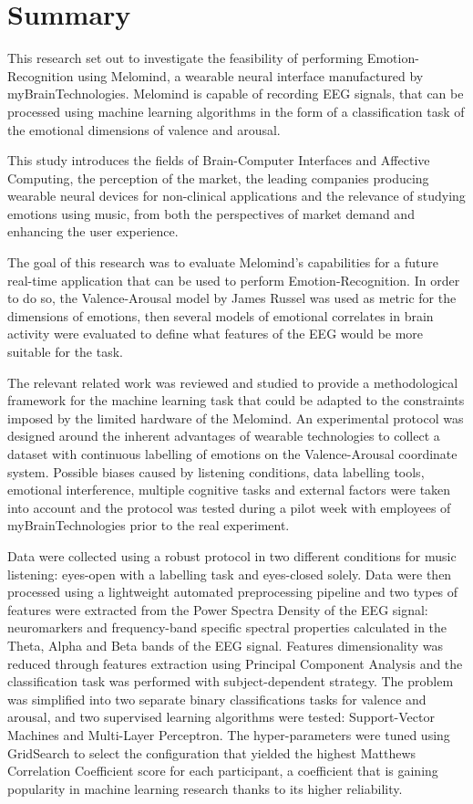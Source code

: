\chapter{Summary}
\pagestyle{headings}

This research set out to investigate the feasibility of performing Emotion-Recognition using Melomind, a wearable neural interface manufactured by myBrainTechnologies. Melomind is capable of recording EEG signals, that can be processed using machine learning algorithms in the form of a classification task of the emotional dimensions of valence and arousal.

This study introduces the fields of Brain-Computer Interfaces and Affective Computing, the perception of the market, the leading companies producing wearable neural devices for non-clinical applications and the relevance of studying emotions using music, from both the perspectives of market demand and enhancing the user experience.

The goal of this research was to evaluate Melomind's capabilities for a future real-time application that can be used to perform Emotion-Recognition. In order to do so, the Valence-Arousal model by James Russel was used as metric for the dimensions of emotions, then several models of emotional correlates in brain activity were evaluated to define what features of the EEG would be more suitable for the task.

The relevant related work was reviewed and studied to provide a methodological framework for the machine learning task that could be adapted to the constraints imposed by the limited hardware of the Melomind. An experimental protocol was designed around the inherent advantages of wearable technologies to collect a dataset with continuous labelling of emotions on the Valence-Arousal coordinate system. Possible biases caused by listening conditions, data labelling tools, emotional interference, multiple cognitive tasks and external factors were taken into account and the protocol was tested during a pilot week with employees of myBrainTechnologies prior to the real experiment.

Data were collected using a robust protocol in two different conditions for music listening: eyes-open with a labelling task and eyes-closed solely. Data were then processed using a lightweight automated preprocessing pipeline and two types of features were extracted from the Power Spectra Density of the EEG signal: neuromarkers and frequency-band specific spectral properties calculated in the Theta, Alpha and Beta bands of the EEG signal. Features dimensionality was reduced through features extraction using Principal Component Analysis and the classification task was performed with subject-dependent strategy. The problem was simplified into two separate binary classifications tasks for valence and arousal, and two supervised learning algorithms were tested: Support-Vector Machines and Multi-Layer Perceptron. The hyper-parameters were tuned using GridSearch to select the configuration that yielded the highest Matthews Correlation Coefficient score for each participant, a coefficient that is gaining popularity in machine learning research thanks to its higher reliability. 

